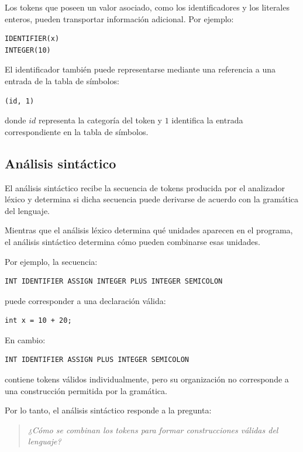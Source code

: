 \documentclass[11pt,a4paper]{article}
\begin{document}
Los tokens que poseen un valor asociado, como los identificadores y los
literales enteros, pueden transportar información adicional. Por ejemplo:

\begin{lstlisting}
IDENTIFIER(x)
INTEGER(10)
\end{lstlisting}

El identificador también puede representarse mediante una referencia a una
entrada de la tabla de símbolos:

\begin{lstlisting}
(id, 1)
\end{lstlisting}

donde $id$ representa la categoría del token y $1$ identifica la entrada
correspondiente en la tabla de símbolos.

\subsection{Análisis sintáctico}

El análisis sintáctico recibe la secuencia de tokens producida por el
analizador léxico y determina si dicha secuencia puede derivarse de acuerdo
con la gramática del lenguaje.

Mientras que el análisis léxico determina qué unidades aparecen en el
programa, el análisis sintáctico determina cómo pueden combinarse esas
unidades.

Por ejemplo, la secuencia:

\begin{lstlisting}
INT IDENTIFIER ASSIGN INTEGER PLUS INTEGER SEMICOLON
\end{lstlisting}

puede corresponder a una declaración válida:

\begin{lstlisting}
int x = 10 + 20;
\end{lstlisting}

En cambio:

\begin{lstlisting}
INT IDENTIFIER ASSIGN PLUS INTEGER SEMICOLON
\end{lstlisting}

contiene tokens válidos individualmente, pero su organización no corresponde
a una construcción permitida por la gramática.

Por lo tanto, el análisis sintáctico responde a la pregunta:

\begin{quote}
\textit{¿Cómo se combinan los tokens para formar construcciones válidas del
lenguaje?}
\end{quote}
\end{document}
